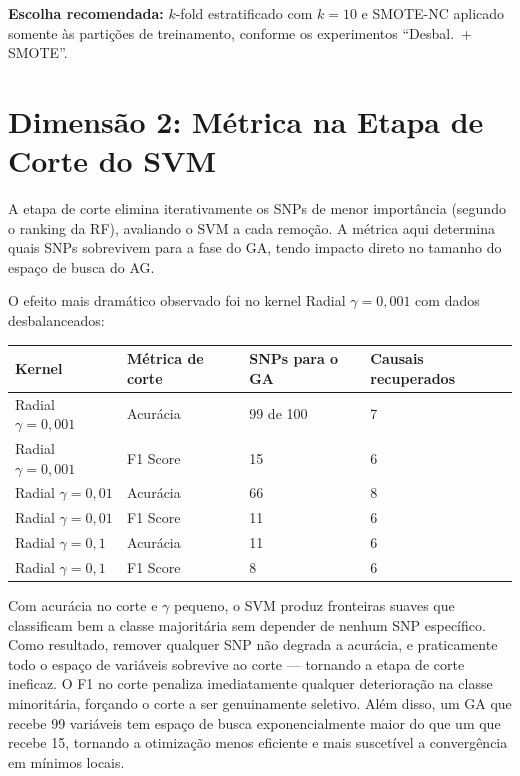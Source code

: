 \documentclass[
    12pt,
    a4paper,
    oneside,
    english,
    french,
    spanish,
    brazil
    ]{abntex2}
\renewcommand{\arraystretch}{1.3}
\newcommand{\novo}[1]{\textcolor{corNova}{#1}}
\begin{document}
\novo{\textbf{Escolha recomendada:} $k$-fold estratificado com $k = 10$ e SMOTE-NC aplicado somente às partições de treinamento, conforme os experimentos ``Desbal.\ + SMOTE''.}

\section*{Dimensão 2: Métrica na Etapa de Corte do SVM}

\novo{A etapa de corte elimina iterativamente os SNPs de menor importância (segundo o ranking da RF), avaliando o SVM a cada remoção. A métrica aqui determina quais SNPs sobrevivem para a fase do GA, tendo impacto direto no tamanho do espaço de busca do AG.}

\novo{O efeito mais dramático observado foi no kernel Radial $\gamma = 0{,}001$ com dados desbalanceados:}

\begin{center}
\footnotesize
\setlength{\tabcolsep}{4pt}
\renewcommand{\arraystretch}{1.4}
\begin{tabular}{L{4.0cm}|C{2.8cm}|C{2.8cm}|C{2.8cm}}
  \textbf{Kernel} & \textbf{Métrica de corte} & \textbf{SNPs para o GA} & \textbf{Causais recuperados} \\
  \hline
  Radial $\gamma = 0{,}001$ & Acurácia & 99 de 100 & 7 \\
  Radial $\gamma = 0{,}001$ & F1 Score  & 15 & 6 \\
  \hline
  Radial $\gamma = 0{,}01$ & Acurácia & 66 & 8 \\
  Radial $\gamma = 0{,}01$ & F1 Score  & 11 & 6 \\
  \hline
  Radial $\gamma = 0{,}1$ & Acurácia & 11 & 6 \\
  Radial $\gamma = 0{,}1$ & F1 Score  & 8 & 6 \\
\end{tabular}
\end{center}
\renewcommand{\arraystretch}{1.3}

\novo{Com acurácia no corte e $\gamma$ pequeno, o SVM produz fronteiras suaves que classificam bem a classe majoritária sem depender de nenhum SNP específico. Como resultado, remover qualquer SNP não degrada a acurácia, e praticamente todo o espaço de variáveis sobrevive ao corte --- tornando a etapa de corte ineficaz. O F1 no corte penaliza imediatamente qualquer deterioração na classe minoritária, forçando o corte a ser genuinamente seletivo. Além disso, um GA que recebe 99 variáveis tem espaço de busca exponencialmente maior do que um que recebe 15, tornando a otimização menos eficiente e mais suscetível a convergência em mínimos locais.}
\end{document}
